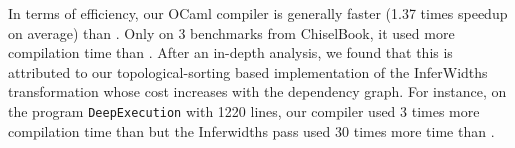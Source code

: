 In terms of efficiency, our OCaml {\firrtl} compiler is generally faster (1.37 times speedup on average) than {\firtool}.
Only on 3 benchmarks from ChiselBook, it used more compilation time than {\firtool}.
After an in-depth analysis, we found that this is attributed to our topological-sorting based implementation of
the InferWidths transformation whose cost increases with the dependency graph.
For instance, on the program \texttt{DeepExecution} with 1220 lines,
 our compiler used 3 times more compilation time than {\firtool} but
 the Inferwidths pass used 30 times more   time than {\firtool}.


